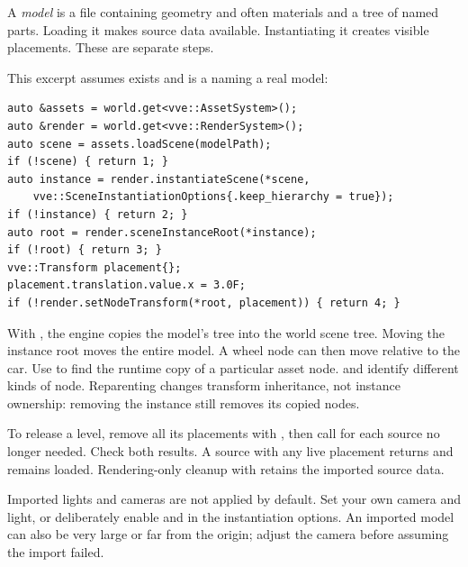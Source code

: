 \documentclass[11pt,a4paper]{article}
\begin{document}
A \emph{model} is a file containing geometry and often materials and a tree of named parts. Loading it makes source data available. Instantiating it creates visible placements. These are separate steps.

This excerpt assumes  exists and  is a  naming a real model:
\begin{lstlisting}
auto &assets = world.get<vve::AssetSystem>();
auto &render = world.get<vve::RenderSystem>();
auto scene = assets.loadScene(modelPath);
if (!scene) { return 1; }
auto instance = render.instantiateScene(*scene,
    vve::SceneInstantiationOptions{.keep_hierarchy = true});
if (!instance) { return 2; }
auto root = render.sceneInstanceRoot(*instance);
if (!root) { return 3; }
vve::Transform placement{};
placement.translation.value.x = 3.0F;
if (!render.setNodeTransform(*root, placement)) { return 4; }
\end{lstlisting}
With , the engine copies the model's tree into the world scene tree. Moving the instance root moves the entire model. A wheel node can then move relative to the car. Use  to find the runtime copy of a particular asset node.  and  identify different kinds of node. Reparenting changes transform inheritance, not instance ownership: removing the instance still removes its copied nodes.

To release a level, remove all its placements with , then call  for each source no longer needed. Check both results. A source with any live placement returns  and remains loaded. Rendering-only cleanup with  retains the imported source data.

Imported lights and cameras are not applied by default. Set your own camera and light, or deliberately enable  and  in the instantiation options. An imported model can also be very large or far from the origin; adjust the camera before assuming the import failed.
\end{document}
